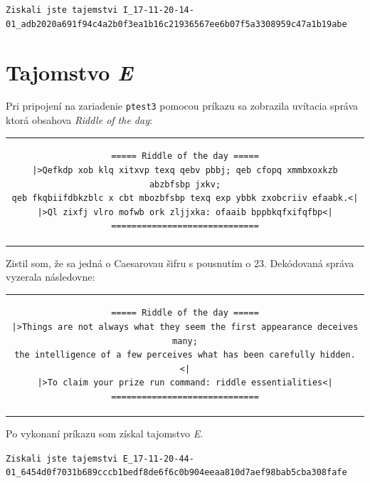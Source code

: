 \documentclass[11pt,a4paper]{article}
\begin{document}
\begin{center}
\small{\texttt{Ziskali jste tajemstvi I\_17-11-20-14-01\_adb2020a691f94c4a2b0f3ea1b16c21936567ee6b07f5a3308959c47a1b19abe}}
\end{center}

\section{Tajomstvo \textit{E}}\label{sec:E}

Pri pripojení na zariadenie \texttt{ptest3} pomocou príkazu  sa zobrazila uvítacia správa ktorá obsahova \textit{Riddle of the day}:

\begin{center}
\begin{tabular}{c}
\begin{lstlisting}[basicstyle=\footnotesize]
===== Riddle of the day =====
|>Qefkdp xob klq xitxvp texq qebv pbbj; qeb cfopq xmmbxoxkzb abzbfsbp jxkv;
qeb fkqbiifdbkzblc x cbt mbozbfsbp texq exp ybbk zxobcriiv efaabk.<|
|>Ql zixfj vlro mofwb ork zljjxka: ofaaib bppbkqfxifqfbp<|
=============================
\end{lstlisting}
\end{tabular}
\end{center}

Zistil som, že sa jedná o Caesarovau šifru s pousnutím o 23. Dekódovaná správa vyzerala následovne:

\begin{center}
\begin{tabular}{c}
\begin{lstlisting}[basicstyle=\footnotesize]
===== Riddle of the day =====
|>Things are not always what they seem the first appearance deceives many;
the intelligence of a few perceives what has been carefully hidden.<|
|>To claim your prize run command: riddle essentialities<|
=============================
\end{lstlisting}
\end{tabular}
\end{center}

Po vykonaní príkazu  som získal tajomstvo \textit{E}.

\begin{center}
\small{\texttt{Ziskali jste tajemstvi E\_17-11-20-44-01\_6454d0f7031b689cccb1bedf8de6f6c0b904eeaa810d7aef98bab5cba308fafe}}
\end{center}
\end{document}

